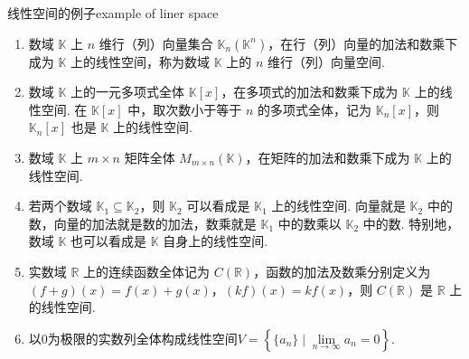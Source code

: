 \documentclass[12pt, a4paper,newtx]{ctexart}
\begin{document}
	\begin{example}{线性空间的例子}{example of liner space}
		\begin{enumerate}
			\item  数域 $ \mathbb{K} $ 上 $ n $ 维行（列）向量集合 $ \mathbb{K}_n(\mathbb{K}^n) $，在行（列）向量的加法和数乘下成为 $ \mathbb{K} $ 上的线性空间，称为数域 $ \mathbb{K} $ 上的 $ n $ 维行（列）向量空间. 
			\item  数域 $ \mathbb{K} $ 上的一元多项式全体 $ \mathbb{K}[x] $，在多项式的加法和数乘下成为 $ \mathbb{K} $ 上的线性空间. 在 $ \mathbb{K}[x] $ 中，取次数小于等于 $ n $ 的多项式全体，记为 $ \mathbb{K}_n[x] $，则 $ \mathbb{K}_n[x] $ 也是 $ \mathbb{K} $ 上的线性空间. 
			\item 数域 $ \mathbb{K} $ 上 $ m \times n $ 矩阵全体 $ M_{m \times n}(\mathbb{K}) $，在矩阵的加法和数乘下成为 $ \mathbb{K} $ 上的线性空间. 
			\item 若两个数域 $ \mathbb{K}_1 \subseteq \mathbb{K}_2 $，则 $ \mathbb{K}_2 $ 可以看成是 $ \mathbb{K}_1 $ 上的线性空间. 向量就是 $ \mathbb{K}_2 $ 中的数，向量的加法就是数的加法，数乘就是 $ \mathbb{K}_1 $ 中的数乘以 $ \mathbb{K}_2 $ 中的数. 特别地，数域 $ \mathbb{K} $ 也可以看成是 $ \mathbb{K} $ 自身上的线性空间. 
			\item 实数域 $ \mathbb{R} $ 上的连续函数全体记为 $ C(\mathbb{R}) $，函数的加法及数乘分别定义为 $ (f+g)(x) = f(x) + g(x) $，$ (kf)(x) = kf(x) $，则 $ C(\mathbb{R}) $ 是 $ \mathbb{R} $ 上的线性空间. 
			\item 以$0$为极限的实数列全体构成线性空间$V=\left\{\{a_n\}\mid\lim\limits_{n\to\infty}a_n=0\right\}. $
		\end{enumerate}
	\end{example}
\end{document}
